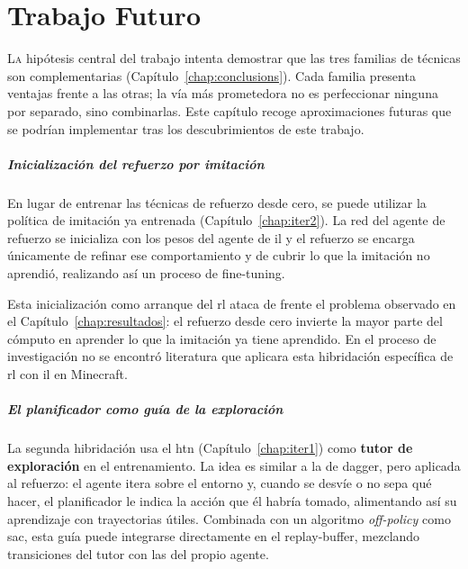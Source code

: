 \chapter{Trabajo Futuro}
\label{chap:trabajo_futuro}

\lettrine{L}{a} hipótesis central del trabajo intenta demostrar que las tres familias de técnicas son
complementarias (Capítulo~\ref{chap:conclusions}). Cada familia presenta ventajas frente a las otras; 
la vía más prometedora no es perfeccionar ninguna por separado, sino combinarlas.
Este capítulo recoge aproximaciones futuras que se podrían implementar tras los descubrimientos
de este trabajo.

\paragraph{Inicialización del refuerzo por imitación}
\label{sec:tf-il-rl}
En lugar de entrenar las técnicas de refuerzo desde cero, se puede utilizar la política de imitación
ya entrenada (Capítulo~\ref{chap:iter2}). La red del agente de refuerzo se inicializa 
con los pesos del agente de \gls{il} y el refuerzo 
se encarga únicamente de refinar ese comportamiento y de cubrir lo que la
imitación no aprendió, realizando así un proceso de \gls{fine-tuning}. 

Esta inicialización como arranque del \gls{rl} ataca de frente el problema observado en el
Capítulo~\ref{chap:resultados}: el refuerzo desde cero invierte la mayor parte del cómputo
en aprender lo que la imitación ya tiene aprendido. En el proceso de investigación no se 
encontró literatura que aplicara esta hibridación específica de \gls{rl} con \gls{il} 
en Minecraft.

\paragraph{El planificador como guía de la exploración}
\label{sec:tf-htn-rl}
La segunda hibridación usa el \gls{htn} (Capítulo~\ref{chap:iter1}) como 
\textbf{tutor de exploración} en el entrenamiento. La idea es similar a la de \gls{dagger}, 
pero aplicada al refuerzo: el agente itera sobre el entorno y, 
cuando se desvíe o no sepa qué hacer, el planificador le indica la acción
que él habría tomado, alimentando así su aprendizaje con trayectorias útiles.
Combinada con un algoritmo \emph{off-policy} como \gls{sac}, 
esta guía puede integrarse directamente en el
\gls{replay-buffer}, mezclando transiciones del tutor con las del propio agente.

